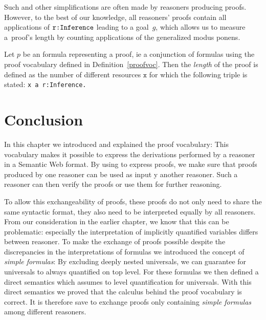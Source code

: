 Such and other simplifications are often made by \nthree reasoners producing proofs.
% 
% 
% 
However, to the best of our knowledge,
all reasoners' proofs contain all applications of $\verb!r:Inference!$ leading to a goal~$g$,
which allows us to measure a~proof's length by counting applications of the generalized modus ponens.

\begin{definition}
Let $p$ be an \nthree formula representing a proof, ie a conjunction of formulas using the proof vocabulary defined in Definition~\ref{proofvoc}. 
Then the \emph{length} of the proof is defined as the number of different resources $\texttt{x}$ for which the following triple is stated:
 \texttt{x a r:Inference.}
\end{definition}


\section{Conclusion}
In this chapter we introduced and explained the \nthree proof vocabulary: This vocabulary makes it possible to express the derivations performed by a reasoner in a Semantic Web format. 
By using \nthree to express proofs, we make sure that proofs produced by one reasoner can be used as input y another reasoner. Such a reasoner
can then verify the proofs or use them for further reasoning. 

To allow this exchangeability of proofs, these proofs do not only need to share the same syntactic format, they also need to be interpreted equally by all reasoners. 
From our consideration in the earlier chapter, we know that this can be problematic: especially the interpretation of implicitly quantified variables differs between reasoner.
To make the exchange of proofs possible despite the discrepancies in the interpretations of \nthree formulas we 
introduced the concept of \emph{simple formulas}: By excluding deeply nested universals,  we can guarantee for universals to  always quantified on top level. For these formulas 
we then defined a direct semantics which assumes to level quantification for universals. With this direct semantics we proved that the calculus behind the proof vocabulary is correct.
It is therefore save to exchange proofs only containing \emph{simple formulas} among different reasoners.

